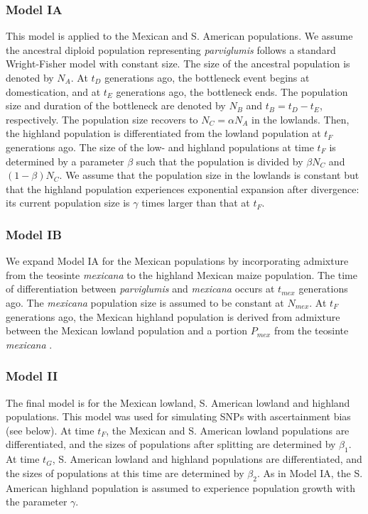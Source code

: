 \subsubsection{Model IA}
This model is applied to the Mexican and S. American populations.
We assume the ancestral diploid population representing \emph{parviglumis} follows a standard Wright-Fisher model with constant size.  
The size of the ancestral population is denoted by $N_A$.
At $t_D$ generations ago, the bottleneck event begins at domestication, and at $t_E$ generations ago, the bottleneck ends.  
The population size and duration of the bottleneck are denoted by $N_B$ and $t_B=t_D-t_E$, respectively.  
The population size recovers to $N_C=\alpha N_A$ in the lowlands.  
Then, the highland population is differentiated from the lowland population at $t_F$ generations ago.  
The size of the low- and highland populations at time $t_F$ is determined by a parameter $\beta$ such that the population is divided by $\beta N_C$ and $(1-\beta)N_C$.  
We assume that the population size in the lowlands is constant but that the highland population experiences exponential expansion after divergence: its current population size is $\gamma$ times larger than that at $t_F$.  \\

\subsubsection{Model IB}
We expand Model IA for the Mexican populations by incorporating admixture from the teosinte \emph{mexicana} to the highland Mexican maize population.  
The time of differentiation between \emph{parviglumis} and \emph{mexicana} occurs at $t_{mex}$ generations ago.  
The \emph{mexicana} population size is assumed to be constant at $N_{mex}$.  
At $t_F$ generations ago, the Mexican highland population is derived from admixture between the Mexican lowland population and a portion $P_{mex}$ from the teosinte \emph{mexicana} .  \\

\subsubsection{Model II}
The final model is for the Mexican lowland, S. American lowland and highland populations.  
This model was used for simulating SNPs with ascertainment bias (see below).  
At time $t_F$, the Mexican and S. American lowland populations are differentiated, and the sizes of populations after splitting are determined by $\beta_1$.  
At time $t_G$, S. American lowland and highland populations are differentiated, and the sizes of populations at this time are determined by $\beta_2$.  
As in Model IA, the S. American highland population is assumed to experience population growth with the parameter $\gamma$.\\


